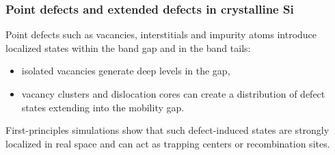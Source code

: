 



\subsubsection{Point defects and extended defects in crystalline Si}

Point defects such as vacancies, interstitials and impurity atoms introduce localized states within the band gap and in the band tails:
\begin{itemize}
  \item isolated vacancies generate deep levels in the gap, 
  \item vacancy clusters and dislocation cores can create a distribution of defect states extending into the mobility gap.\cite{AtomisticBandTailSi,Drabold1999}
\end{itemize}
First-principles simulations show that such defect-induced states are strongly localized in real space and can act as trapping centers or recombination sites.\cite{AtomisticBandTailSi,AttaFynn2004}

